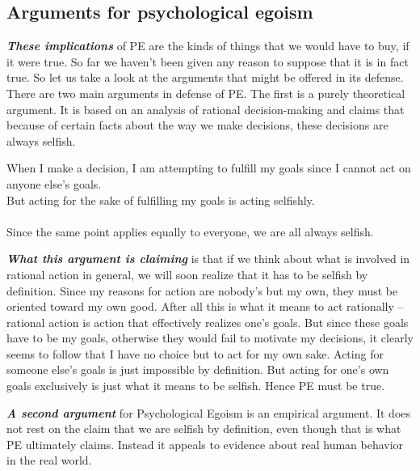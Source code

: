 \documentclass[12pt, openany]{book}
\begin{document}
\hypertarget{arguments-for-psychological-egoism}{%
\subsection*{Arguments for psychological egoism}\label{arguments-for-psychological-egoism}}


\textbf{\emph{These implications}} of PE are the kinds of things that we would have to buy, if it were true. So far we haven't been given any reason to suppose that it is in fact true. So let us take a look at the arguments that might be offered in its defense. There are two main arguments in defense of PE. The first is a purely theoretical argument. It is based on an analysis of rational decision-making and claims that because of certain facts about the way we make decisions, these decisions are always selfish.

\begin{center}

\begin{argument}

When I make a decision, I am attempting to fulfill my goals since I cannot act on anyone else's goals.\\
But acting for the sake of fulfilling my goals is acting selfishly.\\
~\\
Since the same point applies equally to everyone, we are all always selfish.

\end{argument}

\end{center}

\textbf{\emph{What this argument is claiming}} is that if we think about what is involved in rational action in general, we will soon realize that it has to be selfish by definition. Since my reasons for action are nobody's but my own, they must be oriented toward my own good. After all this is what it means to act rationally -- rational action is action that effectively realizes one's goals. But since these goals have to be my goals, otherwise they would fail to motivate my decisions, it clearly seems to follow that I have no choice but to act for my own sake. Acting for someone else's goals is just impossible by definition. But acting for one's own goals exclusively is just what it means to be selfish. Hence PE must be true.

\textbf{\emph{A second argument}} for Psychological Egoism is an empirical argument. It does not rest on the claim that we are selfish by definition, even though that is what PE ultimately claims. Instead it appeals to evidence about real human behavior in the real world.
\end{document}
